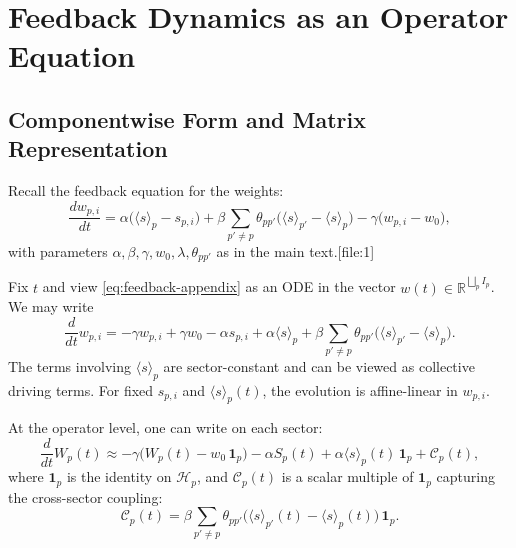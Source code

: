 \documentclass[11pt]{article}
\begin{document}
\section{Feedback Dynamics as an Operator Equation}

\subsection{Componentwise Form and Matrix Representation}

Recall the feedback equation for the weights:
\begin{equation}\label{eq:feedback-appendix}
  \frac{d w_{p,i}}{dt}
    = \alpha\bigl(\langle s \rangle_p - s_{p,i}\bigr)
    + \beta \sum_{p' \neq p} \theta_{pp'}
        \bigl(\langle s \rangle_{p'} - \langle s \rangle_p\bigr)
    - \gamma \bigl(w_{p,i} - w_0\bigr),
\end{equation}
with parameters \(\alpha,\beta,\gamma,w_0,\lambda,\theta_{pp'}\) as in the
main text.[file:1]

Fix \(t\) and view \eqref{eq:feedback-appendix} as an ODE in the vector
\(w(t) \in \mathbb{R}^{\bigsqcup_{p} I_p}\). We may write
\begin{equation}
  \frac{d}{dt} w_{p,i}
    = -\gamma w_{p,i}
      + \gamma w_0
      - \alpha s_{p,i}
      + \alpha \langle s \rangle_p
      + \beta \sum_{p' \neq p} \theta_{pp'}
          \bigl(\langle s \rangle_{p'} - \langle s \rangle_p \bigr).
\end{equation}
The terms involving \(\langle s \rangle_p\) are sector-constant and can be
viewed as collective driving terms. For fixed \(s_{p,i}\) and \(\langle s
\rangle_p(t)\), the evolution is affine-linear in \(w_{p,i}\).

At the operator level, one can write on each sector:
\begin{equation}
  \frac{d}{dt} W_p(t)
    \approx -\gamma \bigl( W_p(t) - w_0\,\mathbf{1}_p \bigr)
      - \alpha S_p(t)
      + \alpha \langle s \rangle_p(t)\,\mathbf{1}_p
      + \mathcal{C}_p(t),
\end{equation}
where \(\mathbf{1}_p\) is the identity on \(\mathcal{H}_p\), and
\(\mathcal{C}_p(t)\) is a scalar multiple of \(\mathbf{1}_p\) capturing
the cross-sector coupling:
\begin{equation}
  \mathcal{C}_p(t)
    = \beta \sum_{p' \neq p}
        \theta_{pp'}
        \bigl(\langle s \rangle_{p'}(t) - \langle s \rangle_p(t) \bigr)
        \,\mathbf{1}_p.
\end{equation}
\end{document}
